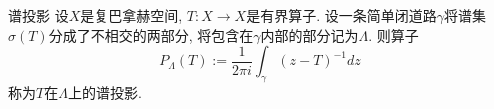 

\begin{definition}{谱投影}
设$X$是复巴拿赫空间, $T:X\to X$是有界算子. 设一条简单闭道路$\gamma$将谱集$\sigma(T)$分成了不相交的两部分, 将包含在$\gamma$内部的部分记为$\Lambda$. 则算子
$$
P_\Lambda(T):=\frac{1}{2\pi i}\int_\gamma(z-T)^{-1}dz
$$
称为$T$在$\Lambda$上的谱投影.
\end{definition}